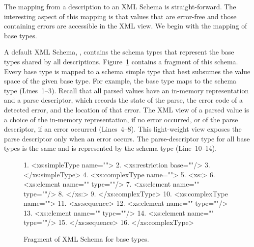 The mapping from a \pads{} description to an XML Schema is 
straight-forward.  The interesting aspect of this mapping is that
\pads{} values that are error-free and those containing errors are
accessible in the XML view.  We begin with the mapping of \pads{} base
types. 

A default XML Schema, , contains the schema types that
represent the \pads{} base types shared by all \pads{} descriptions.
Figure~\ref{figure:pads.xsd} contains a fragment of this schema.
Every \pads{} base type is mapped to a schema simple type that best
subsumes the value space of the given \pads{} base type.  For example,
the  base type maps to the schema type 
(Lines~1--3).  Recall that all parsed \pads{} values have an in-memory
representation and a parse descriptor, which records the state of the
parse, the error code of a detected error, and the location of that
error.  The XML view of a parsed value is a choice of the in-memory
representation, if no error occurred, or of the parse descriptor, if
an error occurred (Lines~4--8).  This light-weight view exposes the
parse descriptor only when an error occurs.  The parse-descriptor type
for all base types is the same and is represented by the schema type
 (Line~10--14).

\begin{figure}
\begin{small}
\begin{code}
 1. <xs:simpleType name="">
 2.  <xs:restriction base=""/>
 3. </xs:simpleType>
 4. <xs:complexType name="">
 5.  <xs:>
 6.   <xs:element name="" type=""/>
 7.   <xs:element name=""  type=""/>
 8.  </xs:>
 9. </xs:complexType>
{10}. <xs:complexType name="">
{11}.  <xs:sequence>
{12}.   <xs:element name=""  type=""/>
{13}.   <xs:element name="" type=""/>
{14}.   <xs:element name=""     type=""/>
{15}.  </xs:sequence>
{16}. </xs:complexType>
\end{code}
\end{small}
\caption{Fragment of XML Schema for \pads{} base types.}
\label{figure:pads.xsd}
\end{figure}


